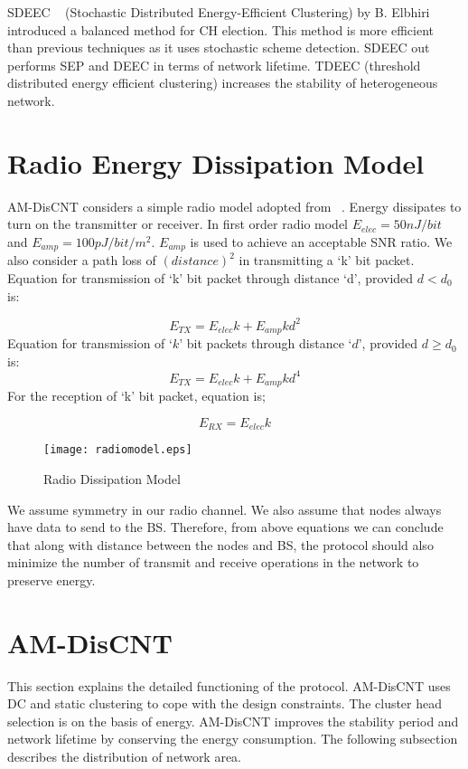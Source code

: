 \documentclass[journal]{IEEEtran}
\begin{document}
 SDEEC ~\cite{15} (Stochastic Distributed Energy-Efficient Clustering) by B. Elbhiri introduced a balanced method for CH election. This method is more efficient than previous techniques as it uses stochastic scheme detection. SDEEC out performs SEP and DEEC in terms of network lifetime.
  TDEEC (threshold distributed energy efficient clustering) increases the stability of heterogeneous network.


\section{Radio Energy Dissipation Model}
AM-DisCNT considers a simple radio model adopted from ~\cite{16}. Energy dissipates to turn on the transmitter or receiver. In first order radio model $E_{elec} = 50 nJ/bit$ and $E_{amp} = 100 pJ/bit/m^2$. $E_{amp}$ is used to achieve an acceptable SNR ratio.
We also consider a path loss of $(distance)^2$ in transmitting a ‘k’ bit packet. Equation for transmission of ‘k’ bit packet through distance ‘d’, provided $d<d_{0}$ is:

 \begin{equation}
 E_{TX} = E_{elec}k+E_{amp}kd^2
 \end{equation}
 Equation for transmission of $‘k’$ bit packets through distance $‘d’$, provided $d \geqslant d_{0}$ is:
 \begin{equation}
 E_{TX} = E_{elec}k+E_{amp}kd^4
 \end{equation}
  For the reception of ‘k’ bit packet, equation is;

 \begin{equation}
 E_{RX} = E_{elec}k
 \end{equation}

\begin{figure}[ht]
\begin{center}
\texttt{[image: radiomodel.eps]}
\caption{Radio Dissipation Model}
\end{center}
\end{figure}
We assume symmetry in our radio channel. We also assume that nodes always have data to send to the BS. Therefore, from above equations we can conclude that along with distance between the nodes and BS, the protocol should also minimize the number of transmit and receive operations in the network to preserve energy.
\section{AM-DisCNT}
 This section explains the detailed functioning of the protocol. AM-DisCNT uses DC and static clustering to cope with the design constraints. The cluster head selection is on the basis of energy. AM-DisCNT improves the stability period and network lifetime by conserving the energy consumption.
 The following subsection describes the distribution of network area.
\end{document}

